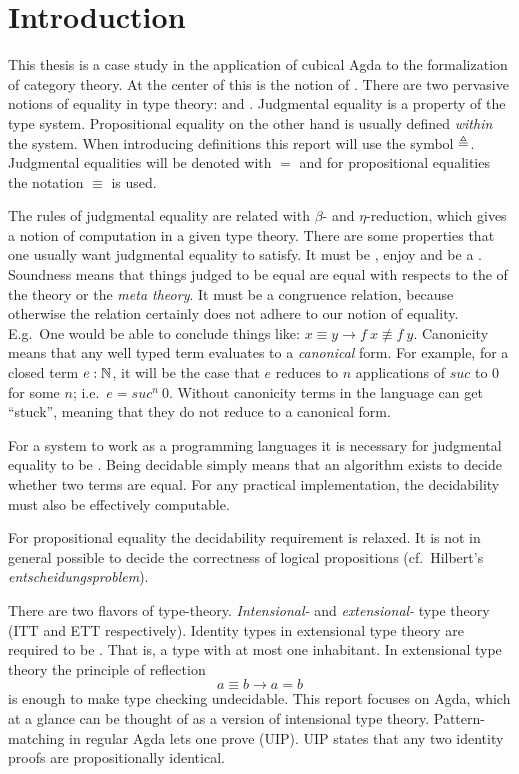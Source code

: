 \chapter{Introduction}
This thesis is a case study in the application of cubical Agda to the
formalization of category theory. At the center of this is the notion
of . There are two pervasive notions of equality
in type theory:  and
. Judgmental equality is a property
of the type system.  Propositional equality on the other hand is
usually defined \emph{within} the system.  When introducing
definitions this report will use the symbol $\mathrel{\triangleq}$.  Judgmental
equalities will be denoted with $=$ and for propositional equalities
the notation $\equiv$ is used.

The rules of judgmental equality are related with $β$- and
$η$-reduction, which gives a notion of computation in a given type
theory.
%
There are some properties that one usually want judgmental equality to
satisfy. It must be , enjoy 
and be a . Soundness means that things
judged to be equal are equal with respects to the 
of the theory or the \emph{meta theory}. It must be a congruence
relation, because otherwise the relation certainly does not adhere to
our notion of equality. E.g.\ One would be able to conclude things
like: $x \equiv y \rightarrow f\ x \nequiv f\ y$. Canonicity means
that any well typed term evaluates to a \emph{canonical} form. For
example, for a closed term $e \mathrel{:} \mathbb{N}$, it will be the case that $e$
reduces to $n$ applications of $\mathit{suc}$ to $0$ for some $n$;
i.e.\ $e = \mathit{suc}^n\ 0$.  Without canonicity terms in the
language can get ``stuck'', meaning that they do not reduce to a
canonical form.

For a system to work as a programming languages it is necessary for
judgmental equality to be . Being decidable
simply means that an algorithm exists to decide whether two terms
are equal.  For any practical implementation, the decidability must
also be effectively computable.

For propositional equality the decidability requirement is relaxed. It
is not in general possible to decide the correctness of logical
propositions (cf.\ Hilbert's \emph{entscheidungsproblem}).

There are two flavors of type-theory. \emph{Intensional-} and
\emph{extensional-} type theory (ITT and ETT respectively). Identity
types in extensional type theory are required to be
. That is, a type with at most one
inhabitant. In extensional type theory the principle of reflection
%
$$a ≡ b → a = b$$
%
is enough to make type checking undecidable. This report focuses on
Agda, which at a glance can be thought of as a version of intensional
type theory. Pattern-matching in regular Agda lets one prove
 (UIP). UIP states that any
two identity proofs are propositionally identical.

